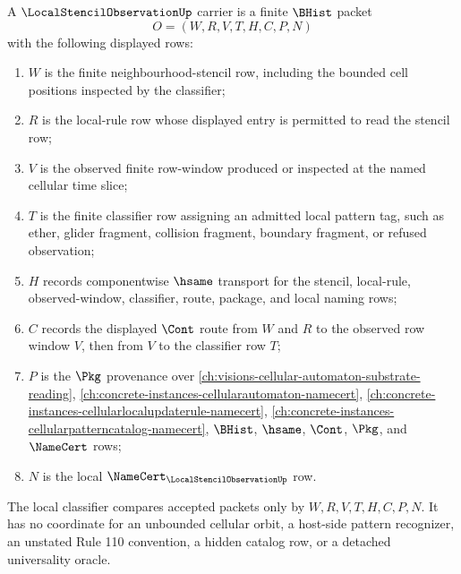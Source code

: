 \begin{definition}
\label{def:local-stencil-observation-carrier}
A $\LocalStencilObservationUp$ carrier is a finite $\BHist$ packet
$$
O=(W,R,V,T,H,C,P,N)
$$
with the following displayed rows:
\begin{enumerate}
\item $W$ is the finite neighbourhood-stencil row, including the bounded cell positions inspected by the classifier;
\item $R$ is the local-rule row whose displayed entry is permitted to read the stencil row;
\item $V$ is the observed finite row-window produced or inspected at the named cellular time slice;
\item $T$ is the finite classifier row assigning an admitted local pattern tag, such as ether, glider fragment, collision fragment, boundary fragment, or refused observation;
\item $H$ records componentwise $\hsame$ transport for the stencil, local-rule, observed-window, classifier, route, package, and local naming rows;
\item $C$ records the displayed $\Cont$ route from $W$ and $R$ to the observed row window $V$, then from $V$ to the classifier row $T$;
\item $P$ is the $\Pkg$ provenance over \autoref{ch:visions-cellular-automaton-substrate-reading}, \autoref{ch:concrete-instances-cellularautomaton-namecert}, \autoref{ch:concrete-instances-cellularlocalupdaterule-namecert}, \autoref{ch:concrete-instances-cellularpatterncatalog-namecert}, $\BHist$, $\hsame$, $\Cont$, $\Pkg$, and $\NameCert$ rows;
\item $N$ is the local $\NameCert_{\LocalStencilObservationUp}$ row.
\end{enumerate}
The local classifier compares accepted packets only by $W,R,V,T,H,C,P,N$. It has no coordinate for an unbounded cellular orbit, a host-side pattern recognizer, an unstated Rule 110 convention, a hidden catalog row, or a detached universality oracle.
\end{definition}

